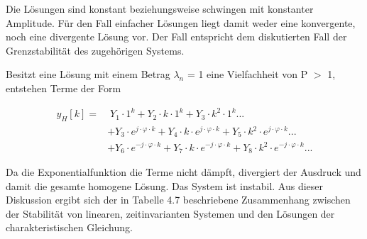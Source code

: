 \noindent Die L\"{o}sungen sind konstant beziehungsweise schwingen mit konstanter Amplitude. F\"{u}r den Fall einfacher L\"{o}sungen liegt damit weder eine konvergente, noch eine divergente L\"{o}sung vor. Der Fall entspricht dem diskutierten Fall der Grenzstabilit\"{a}t des zugeh\"{o}rigen Systems. \medskip

\noindent Besitzt eine L\"{o}sung mit einem Betrag {\textbar}$\lambda_{n}${\textbar} = 1 eine Vielfachheit von P $\mathrm{>}$ 1, entstehen Terme der Form

\begin{equation}\label{eq:fourseventyseven}
\begin{split}
y_{H} \left[k\right] = & \; Y_{1} \cdot 1^{k} +Y_{2} \cdot k\cdot 1^{k} +Y_{3} \cdot k^{2} \cdot 1^{k} ... \\ 
& + Y_{3} \cdot e{}^{j\cdot \varphi \cdot k} +Y{}_{4} \cdot k\cdot e{}^{j\cdot \varphi \cdot k} +Y{}_{5} \cdot k{}^{2} \cdot e{}^{j\cdot \varphi \cdot k} ... \\ 
& + Y{}_{6} \cdot e{}^{-j\cdot \varphi \cdot k} +Y{}_{7} \cdot k\cdot e{}^{-j\cdot \varphi \cdot k} +Y{}_{8} \cdot k{}^{2} \cdot e{}^{-j\cdot \varphi \cdot k} ...
\end{split}
\end{equation}

\noindent Da die Exponentialfunktion die Terme nicht d\"{a}mpft, divergiert der Ausdruck und damit die gesamte homogene L\"{o}sung. Das System ist instabil. Aus dieser Diskussion ergibt sich der in Tabelle 4.7 beschriebene Zusammenhang zwischen der Stabilit\"{a}t von linearen, zeitinvarianten Systemen und den L\"{o}sungen der charakteristischen Gleichung.

\clearpage

